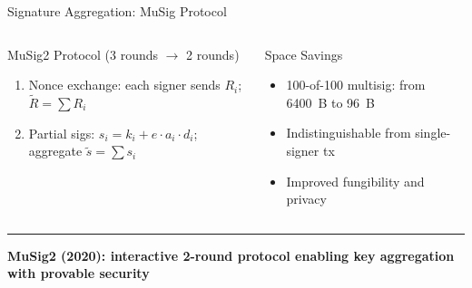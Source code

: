\documentclass[8pt,aspectratio=169]{beamer}
\newcommand{\bottomnote}[1]{\vfill\vspace{-2mm}\textcolor{mllavender2}{\rule{\textwidth}{0.4pt}}\vspace{1mm}\footnotesize\textbf{#1}}
\begin{document}
\begin{frame}{Signature Aggregation: MuSig Protocol}
\begin{columns}
\begin{block}{MuSig2 Protocol (3 rounds $\to$ 2 rounds)}
\begin{enumerate}
  \item Nonce exchange: each signer sends $R_i$; $\tilde{R} = \sum R_i$
  \item Partial sigs: $s_i = k_i + e \cdot a_i \cdot d_i$; aggregate $\tilde{s} = \sum s_i$
\end{enumerate}
\end{block}
\begin{block}{Space Savings}
\begin{itemize}\small
  \item 100-of-100 multisig: from 6400~B to 96~B
  \item Indistinguishable from single-signer tx
  \item Improved fungibility and privacy
\end{itemize}
\end{block}
\end{columns}
\bottomnote{MuSig2 (2020): interactive 2-round protocol enabling key aggregation with provable security}
\end{frame}
\end{document}
